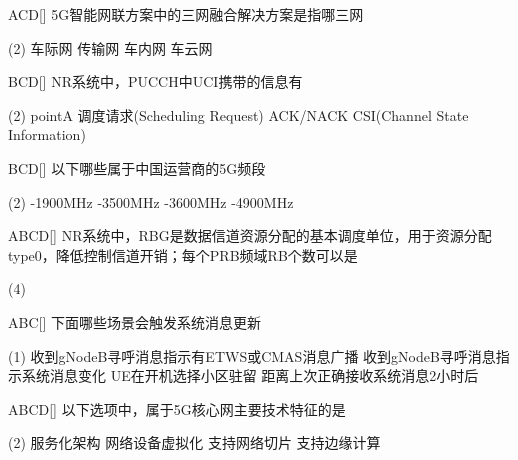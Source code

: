 \begin{choice}{\;ACD\;}[]
    5G智能网联方案中的三网融合解决方案是指哪三网
    \begin{tasks}(2)
        \task 车际网
        \task 传输网
        \task 车内网
        \task 车云网
    \end{tasks}
\end{choice}

\begin{choice}{\;BCD\;}[]
    NR系统中，PUCCH中UCI携带的信息有
    \begin{tasks}(2)
        \task pointA
        \task 调度请求(Scheduling Request)
        \task ACK/NACK
        \task CSI(Channel State Information)
    \end{tasks}
\end{choice}

\begin{choice}{\;BCD\;}[]
    以下哪些属于中国运营商的5G频段
    \begin{tasks}(2)
        -1900MHz
        -3500MHz
        -3600MHz
        -4900MHz
    \end{tasks}
\end{choice}

\begin{choice}{\;ABCD\;}[]
    NR系统中，RBG是数据信道资源分配的基本调度单位，用于资源分配type0，降低控制信道开销；每个PRB频域RB个数可以是
    \begin{tasks}(4)
    \end{tasks}
\end{choice}

\begin{choice}{\;ABC\;}[]
    下面哪些场景会触发系统消息更新
    \begin{tasks}(1)
        \task 收到gNodeB寻呼消息指示有ETWS或CMAS消息广播
        \task 收到gNodeB寻呼消息指示系统消息变化
        \task  UE在开机选择小区驻留
        \task 距离上次正确接收系统消息2小时后
    \end{tasks}
\end{choice}

\begin{choice}{\;ABCD\;}[]
    以下选项中，属于5G核心网主要技术特征的是
    \begin{tasks}(2)
        \task 服务化架构
        \task 网络设备虚拟化
        \task 支持网络切片
        \task 支持边缘计算
    \end{tasks}
\end{choice}

